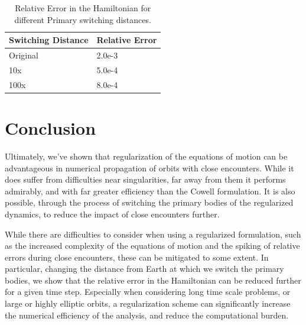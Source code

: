 \documentclass[11pt,twoside,letterpaper]{article}
\begin{document}
  \begin{table}[] \label{switchTable}
    \centering
    \begin{tabular}{|l|l|}
      \hline
      Switching Distance & Relative Error \\ \hline
      Original & 2.0e-3 \\ \hline
      10x & 5.0e-4 \\ \hline
      100x & 8.0e-4 \\ \hline
    \end{tabular}
    \caption{Relative Error in the Hamiltonian for different Primary switching distances.}
  \end{table}

  \section{Conclusion}
  Ultimately, we've shown that regularization of the equations of
  motion can be advantageous in numerical propagation of orbits with
  close encounters. While it does suffer from difficulties near
  singularities, far away from them it performs admirably, and with
  far greater efficiency than the Cowell formulation. It is also
  possible, through the process of switching the primary bodies of the
  regularized dynamics, to reduce the impact of close encounters
  further.

  While there are difficulties to consider when using a regularized
  formulation, such as the increased complexity of the equations of
  motion and the spiking of relative errors during close encounters,
  these can be mitigated to some extent. In particular, changing the
  distance from Earth at which we switch the primary bodies, we show
  that the relative error in the Hamiltonian can be reduced further
  for a given time step. Especially when considering long time scale
  problems, or large or highly elliptic orbits, a regularization
  scheme can significantly increase the numerical efficiency of the
  analysis, and reduce the computational burden. 

  {}
  
\end{document}

